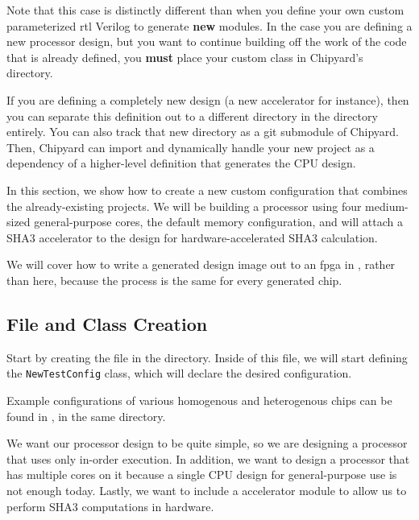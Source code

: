 \begin{blackbox}
  Note that this case is distinctly different than when you define your own custom parameterized \gls{rtl} Verilog to generate \textbf{new} modules.
  In the case you are defining a new processor design, but you want to continue building off the work of the code that is already defined, you \textbf{must} place your custom class in Chipyard's  directory.

  If you are defining a completely new design (a new \gls{accelerator} for instance), then you can separate this definition out to a different directory in the  directory entirely.
  You can also track that new directory as a git submodule of Chipyard.
  Then, Chipyard can import and dynamically handle your new project as a dependency of a higher-level definition that generates the CPU design.
\end{blackbox}

In this section, we show how to create a new custom configuration that combines the already-existing projects.
We will be building a processor using four medium-sized  general-purpose cores, the default memory configuration, and will attach a SHA3 accelerator to the design for hardware-accelerated SHA3 calculation.

We will cover how to write a generated design image out to an \gls{fpga} in , rather than here, because the process is the same for every generated chip.

\subsection{File and Class Creation}\label{sec:Custom_Config-File_Class}
Start by creating the  file in the  directory.
Inside of this file, we will start defining the \texttt{NewTestConfig} class, which will declare the desired configuration.

\begin{blackbox}
  Example configurations of various homogenous and heterogenous chips can be found in , in the same directory.
\end{blackbox}

We want our processor design to be quite simple, so we are designing a processor that uses only in-order execution.
In addition, we want to design a processor that has multiple cores on it because a single CPU design for general-purpose use is not enough today.
Lastly, we want to include a  accelerator module to allow us to perform SHA3 computations in hardware.

